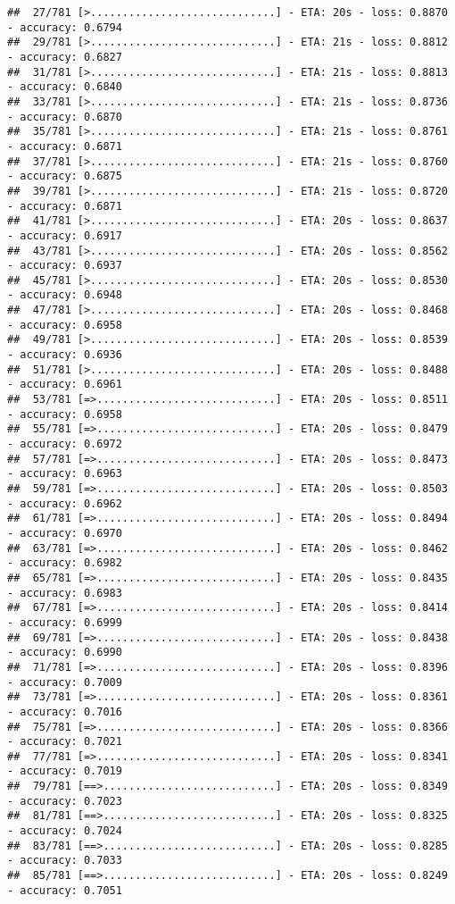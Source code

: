 \documentclass[
]{article}
\begin{document}
\begin{verbatim}
##  27/781 [>.............................] - ETA: 20s - loss: 0.8870 - accuracy: 0.6794
##  29/781 [>.............................] - ETA: 21s - loss: 0.8812 - accuracy: 0.6827
##  31/781 [>.............................] - ETA: 21s - loss: 0.8813 - accuracy: 0.6840
##  33/781 [>.............................] - ETA: 21s - loss: 0.8736 - accuracy: 0.6870
##  35/781 [>.............................] - ETA: 21s - loss: 0.8761 - accuracy: 0.6871
##  37/781 [>.............................] - ETA: 21s - loss: 0.8760 - accuracy: 0.6875
##  39/781 [>.............................] - ETA: 21s - loss: 0.8720 - accuracy: 0.6871
##  41/781 [>.............................] - ETA: 20s - loss: 0.8637 - accuracy: 0.6917
##  43/781 [>.............................] - ETA: 20s - loss: 0.8562 - accuracy: 0.6937
##  45/781 [>.............................] - ETA: 20s - loss: 0.8530 - accuracy: 0.6948
##  47/781 [>.............................] - ETA: 20s - loss: 0.8468 - accuracy: 0.6958
##  49/781 [>.............................] - ETA: 20s - loss: 0.8539 - accuracy: 0.6936
##  51/781 [>.............................] - ETA: 20s - loss: 0.8488 - accuracy: 0.6961
##  53/781 [=>............................] - ETA: 20s - loss: 0.8511 - accuracy: 0.6958
##  55/781 [=>............................] - ETA: 20s - loss: 0.8479 - accuracy: 0.6972
##  57/781 [=>............................] - ETA: 20s - loss: 0.8473 - accuracy: 0.6963
##  59/781 [=>............................] - ETA: 20s - loss: 0.8503 - accuracy: 0.6962
##  61/781 [=>............................] - ETA: 20s - loss: 0.8494 - accuracy: 0.6970
##  63/781 [=>............................] - ETA: 20s - loss: 0.8462 - accuracy: 0.6982
##  65/781 [=>............................] - ETA: 20s - loss: 0.8435 - accuracy: 0.6983
##  67/781 [=>............................] - ETA: 20s - loss: 0.8414 - accuracy: 0.6999
##  69/781 [=>............................] - ETA: 20s - loss: 0.8438 - accuracy: 0.6990
##  71/781 [=>............................] - ETA: 20s - loss: 0.8396 - accuracy: 0.7009
##  73/781 [=>............................] - ETA: 20s - loss: 0.8361 - accuracy: 0.7016
##  75/781 [=>............................] - ETA: 20s - loss: 0.8366 - accuracy: 0.7021
##  77/781 [=>............................] - ETA: 20s - loss: 0.8341 - accuracy: 0.7019
##  79/781 [==>...........................] - ETA: 20s - loss: 0.8349 - accuracy: 0.7023
##  81/781 [==>...........................] - ETA: 20s - loss: 0.8325 - accuracy: 0.7024
##  83/781 [==>...........................] - ETA: 20s - loss: 0.8285 - accuracy: 0.7033
##  85/781 [==>...........................] - ETA: 20s - loss: 0.8249 - accuracy: 0.7051

\end{verbatim}
\end{document}

